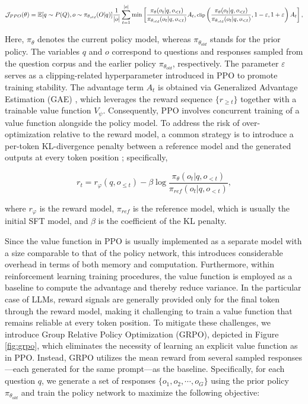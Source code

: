 \begin{itemize}[topsep=0pt]
\begin{itemize}[topsep=0pt]
\begin{equation}
\footnotesize
    \mathcal{J}_{PPO}(\theta) = \mathbb{E}{[q \sim P(Q), o \sim \pi_{\theta_{old}}(O|q)]} \frac{1}{|o|} \sum_{t=1}^{|o|} \min \left[ \frac{\pi_\theta(o_{t} | q, o_{<t})}{\pi_{\theta_{old}}(o_{t} | q, o_{<t})} A_{t}, \text{clip} \left( \frac{\pi_\theta(o_{t} | q, o_{<t})}{\pi_{\theta_{old}}(o_{t} | q, o_{<t})}, 1 - \varepsilon, 1 + \varepsilon \right)  A_{t} \right] ,
\end{equation}

Here, $\pi_{\theta}$ denotes the current policy model, whereas $\pi_{\theta_{old}}$ stands for the prior policy. The variables $q$ and $o$ correspond to questions and responses sampled from the question corpus and the earlier policy $\pi_{\theta_{old}}$, respectively. The parameter $\varepsilon$ serves as a clipping-related hyperparameter introduced in PPO to promote training stability. The advantage term $A_t$ is obtained via Generalized Advantage Estimation (GAE) \citep{gae}, which leverages the reward sequence $\{r_{\ge t}\}$ together with a trainable value function $V_{\psi}$. Consequently, PPO involves concurrent training of a value function alongside the policy model. To address the risk of over-optimization relative to the reward model, a common strategy is to introduce a per-token KL-divergence penalty between a reference model and the generated outputs at every token position \citep{ouyang2022training}; specifically,

\begin{equation}
    r_{t} = r_\varphi(q, o_{\le t}) - \beta \log\frac{\pi_{\theta}(o_{t}|q, o_{<t})}{\pi_{ref}(o_{t}|q, o_{<t})},
\label{eq:PPO-reward}
\end{equation}

where $r_\varphi$  is the reward model, $\pi_{ref}$ is the reference model, which is usually the initial SFT model, and $\beta$  is the coefficient of the KL penalty.

Since the value function in PPO is usually implemented as a separate model with a size comparable to that of the policy network, this introduces considerable overhead in terms of both memory and computation. Furthermore, within reinforcement learning training procedures, the value function is employed as a baseline to compute the advantage and thereby reduce variance. In the particular case of LLMs, reward signals are generally provided only for the final token through the reward model, making it challenging to train a value function that remains reliable at every token position. To mitigate these challenges, we introduce Group Relative Policy Optimization (GRPO), depicted in Figure \ref{fig:grpo}, which eliminates the necessity of learning an explicit value function as in PPO. Instead, GRPO utilizes the mean reward from several sampled responses—each generated for the same prompt—as the baseline. Specifically, for each question $q$, we generate a set of responses $\{o_1, o_2, \cdots, o_G\}$ using the prior policy $\pi_{\theta_{old}}$ and train the policy network to maximize the following objective:


\end{itemize}
\end{itemize}
